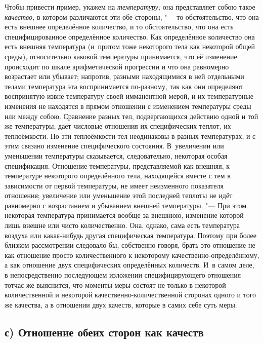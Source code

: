 Чтобы привести пример, укажем на {\em температуру;} она представляет собою
такое {\em качество,} в котором различаются эти обе стороны, "--- то
обстоятельство, что она есть внешнее определённое количество, и то
обстоятельство, что она есть специфицированное определённое количество. Как
определённое количество она есть внешняя температура (и~притом тоже некоторого
тела как некоторой общей среды), относительно каковой температуры принимается,
что её изменение происходит по шкале арифметической прогрессии и что она
равномерно возрастает или убывает; напротив, разными находящимися в ней
отдельными телами температура эта воспринимается по-разному, так как они
определяют воспринятую извне температуру своей имманентной мерой, и их
температурные изменения не находятся в прямом отношении с изменением
температуры среды или между собою. Сравнение разных тел, подвергающихся
действию одной и той же температуры, даёт числовые отношения их специфических
теплот, их теплоёмкости. Но эти теплоёмкости тел неодинаковы в разных
температурах, и с этим связано изменение специфического состояния. В~увеличении
или уменьшении температуры сказывается, следовательно, некоторая особая
спецификация. Отношение температуры, представляемой как внешняя, к температуре
некоторого определённого тела, находящейся вместе с тем в зависимости от первой
температуры, не имеет неизменного показателя отношения; увеличение или
уменьшение этой последней теплоты не идёт равномерно с возрастанием и убыванием
внешней температуры. "--- При этом некоторая температура принимается вообще за
внешнюю, изменение которой лишь внешне или чисто количественно. Она, однако,
сама есть температура воздуха или какая-нибудь другая специфическая
температура. Поэтому при более близком рассмотрении следовало бы, собственно
говоря, брать это отношение не как отношение просто количественного к
некоторому качественно-определённому, а как отношение двух специфических
определённых количеств. И~в самом деле, в непосредственно последующем изложении
специфицирующего отношения тотчас же выяснится, что моменты меры состоят не
только в некоторой количественной и некоторой качественно-количественной
сторонах одного и того же качества, а в отношении двух качеств, которые в самих
себе суть меры.

\subsection[с) Отношение обеих сторон как качеств]%
{с) Отношение обеих сторон как качеств}

